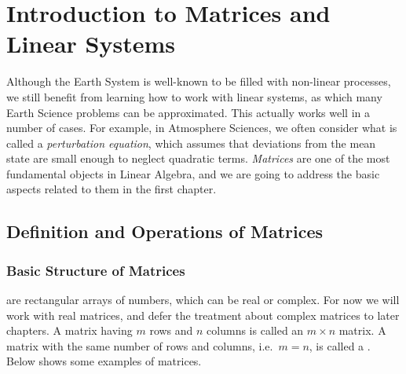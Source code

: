 \chapter{Introduction to Matrices and Linear Systems}

Although the Earth System is well-known to be filled with non-linear processes, we still benefit from learning how to work with linear systems, as which many Earth Science problems can be approximated. This actually works well in a number of cases. For example, in Atmosphere Sciences, we often consider what is called a \textit{perturbation equation}, which assumes that deviations from the mean state are small enough to neglect quadratic terms. \textit{Matrices} are one of the most fundamental objects in Linear Algebra, and we are going to address the basic aspects related to them in the first chapter.

\section{Definition and Operations of Matrices}
\label{section:matrixdefn}

\subsection{Basic Structure of Matrices}
 are rectangular arrays of numbers, which can be real or complex. For now we will work with real matrices, and defer the treatment about complex matrices to later chapters. A matrix having $m$ rows and $n$ columns is called an $m \times n$ matrix. A matrix with the same number of rows and columns, i.e.\ $m = n$, is called a . Below shows some examples of matrices.

